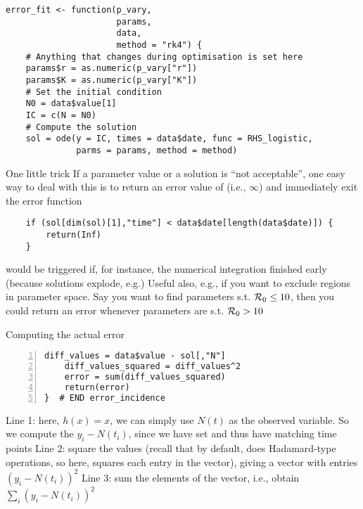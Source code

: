 \documentclass[aspectratio=43]{beamer}
\begin{document}
\begin{frame}[fragile]
\begin{lstlisting}
error_fit <- function(p_vary, 
                      params, 
                      data,
                      method = "rk4") {
    # Anything that changes during optimisation is set here
    params$r = as.numeric(p_vary["r"])
    params$K = as.numeric(p_vary["K"])
    # Set the initial condition
    N0 = data$value[1]
    IC = c(N = N0)
    # Compute the solution
    sol = ode(y = IC, times = data$date, func = RHS_logistic, 
              parms = params, method = method)
\end{lstlisting}
\end{frame}

\begin{frame}[fragile]{One little trick}
    If a parameter value or a solution is ``not acceptable'', one easy way to deal with this is to return an error value of  (i.e., $\infty$) and immediately exit the error function
    \vfill
\begin{lstlisting}
    if (sol[dim(sol)[1],"time"] < data$date[length(data$date)]) {
        return(Inf)
    }    
\end{lstlisting}
would be triggered if, for instance, the numerical integration finished early (because solutions explode, e.g.)
\vfill
Useful also, e.g., if you want to exclude regions in parameter space. Say you want to find parameters s.t. $\mathcal{R}_0\leq 10$, then you could return an  error whenever parameters are s.t. $\mathcal{R}_0>10$
\end{frame}


\begin{frame}[fragile]{Computing the actual error}
\begin{lstlisting}[numbers=left]
    diff_values = data$value - sol[,"N"]
    diff_values_squared = diff_values^2
    error = sum(diff_values_squared)
    return(error)
}  # END error_incidence
\end{lstlisting}
\vfill
Line 1: here, $h(x)=x$, we can simply use $N(t)$ as the observed variable. So we compute the $y_i-N(t_i)$, since we have set  and thus have matching time points
\vfill
Line 2: square the values (recall that by default,  does Hadamard-type operations, so here, squares each entry in the vector), giving a vector with entries $(y_i-N(t_i))^2$
\vfill
Line 3: sum the elements of the vector, i.e., obtain $\sum_{i}(y_i-N(t_i))^2$
\end{frame}
\end{document}
